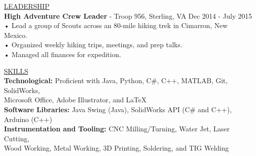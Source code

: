 \documentclass{article}
\begin{document}
\underline{\Large L\normalsize EADERSHIP\qquad\qquad\qquad\qquad\qquad\qquad\qquad\qquad\qquad\qquad\qquad\qquad\qquad\qquad\qquad\qquad\qquad\qquad\qquad\qquad\quad}\\                                                                                                                 
\large\textbf{High Adventure Crew Leader} - Troop 956, Sterling, VA     \hfill Dec 2014 - July 2015\\
\qquad • \quad Lead a group of Scouts across an 80-mile hiking trek in Cimarron, New Mexico.\\
\qquad • \quad Organized weekly hiking trips, meetings, and prep talks.\\
\qquad • \quad Managed all finances for expedition.\\
\vspace{3mm} %

\underline{\Large S\normalsize KILLS\qquad\qquad\qquad\qquad\qquad\qquad\qquad\qquad\qquad\qquad\qquad\qquad\qquad\qquad\qquad\qquad\qquad\qquad\qquad\qquad\qquad\qquad}\\
\large\textbf{Technological:} Proficient with Java, Python, C\#, C++, MATLAB, Git, SolidWorks, \\\qquad Microsoft Office, Adobe Illustrator,  and \LaTeX\\
\large\textbf{Software Libraries:} Java Swing (Java), SolidWorks API (C\# and C++), Arduino (C++)\\
\large\textbf{Instrumentation and Tooling:} CNC Milling/Turning, Water Jet, Laser Cutting,\\\qquad Wood Working, Metal Working, 3D Printing, Soldering, and TIG Welding\\
\end{document}
